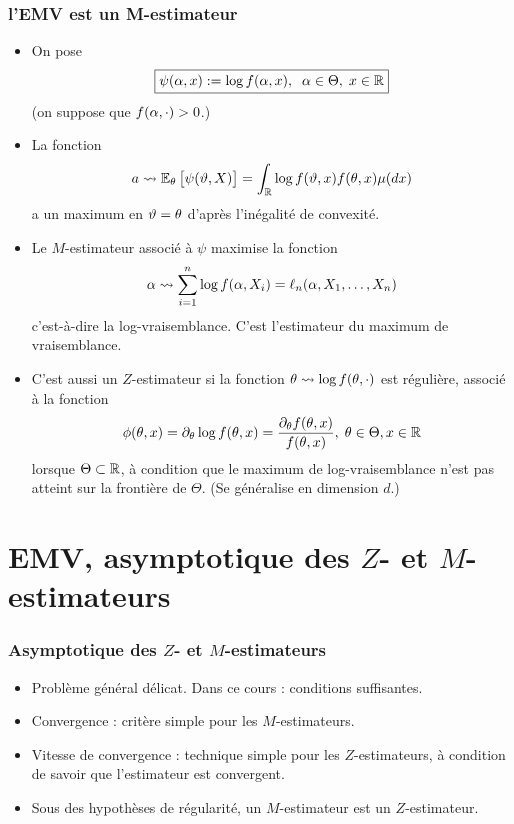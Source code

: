 \begin{frame}
\frametitle{l'EMV est  un M-estimateur}
\begin{itemize}
\item On pose
$$\boxed{\psi(\alpha,x):=\log f(\alpha,x),\;\;\alpha \in \Theta,\;x\in\operatorname{{\mathbb R}}}$$
(on suppose que $f(\alpha,\cdot) >0$.)
\item La fonction
$$a \leadsto \operatorname{{\mathbb E}}_\theta \big[\psi(\vartheta,X)\big]=\int_{\operatorname{{\mathbb R}}}\log f(\vartheta,x) f(\theta,x) \mu(dx)$$
a un maximum en $\vartheta=\theta$ d'après \alert{l'inégalité de convexité}.
\end{itemize}
\end{frame}

\begin{frame}
\begin{itemize}
\item Le $M$-estimateur associé à $\psi$ maximise la fonction
$$\alpha \leadsto \sum_{i = 1}^n \log f(\alpha, X_i) = \ell_n(\alpha, X_1,\ldots, X_n)$$
c'est-à-dire la \alert{ log-vraisemblance}. C'est \alert{l'estimateur du maximum de vraisemblance}.

\item C'est aussi un $Z$-estimateur si la fonction $\theta \leadsto \log f(\theta, \cdot)$ est régulière, associé à la fonction
$$\phi(\theta, x) = \partial_\theta \log f(\theta, x) = \frac{\partial_\theta f(\theta, x)}{f(\theta, x)},\;\theta \in \Theta, x\in \operatorname{{\mathbb R}}$$
lorsque $\Theta \subset \operatorname{{\mathbb R}}$, \`a condition que le maximum de
log-vraisemblance n'est pas atteint sur la frontière de $\Theta$.
(Se généralise en dimension $d$.)
\end{itemize}
\end{frame}


\section{EMV, asymptotique des $Z$- et $M$- estimateurs}

\begin{frame}
\frametitle{Asymptotique des $Z$- et $M$-estimateurs}
\begin{itemize}
\item Problème général \alert{délicat}. Dans ce cours : conditions suffisantes.
\item \alert{Convergence} : critère simple pour les $M$-estimateurs.
\item \alert{Vitesse de convergence} : technique simple pour les $Z$-estimateurs, à condition de savoir que l'estimateur est convergent.
\item Sous des hypothèses de régularité, un $M$-estimateur est un $Z$-estimateur.
\end{itemize}
\end{frame}

